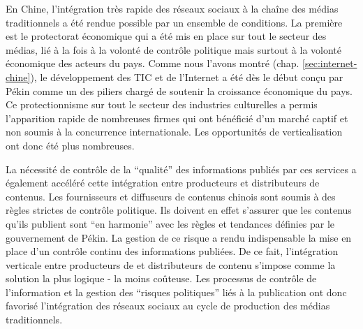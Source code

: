 En Chine, l'intégration très rapide des réseaux sociaux à la chaîne des médias traditionnels a été rendue possible par un ensemble de conditions. La première est le protectorat économique qui a été mis en place sur tout le secteur des médias, lié à la fois à la volonté de contrôle politique mais surtout à la volonté économique des acteurs du pays. Comme nous l'avons montré (chap. \ref{sec:internet-chine}), le développement des TIC et de l'Internet a été dès le début conçu par Pékin comme un des piliers chargé de soutenir la croissance économique du pays. Ce protectionnisme sur tout le secteur des industries culturelles a permis l'apparition rapide de nombreuses firmes qui ont bénéficié d'un marché captif et non soumis à la concurrence internationale. Les opportunités de verticalisation ont donc été plus nombreuses. 

La nécessité de contrôle de la ``qualité'' des informations publiés par ces services a également accéléré cette intégration entre producteurs et distributeurs de contenus. Les fournisseurs et diffuseurs de contenus chinois sont soumis à des règles strictes de contrôle politique. Ils doivent en effet s'assurer que les contenus qu'ils publient sont ``en harmonie'' avec les règles et tendances définies par le gouvernement de Pékin. La gestion de ce risque a rendu indispensable la mise en place d'un contrôle continu des informations publiées. De ce fait, l'intégration verticale entre producteurs de et distributeurs de contenu s'impose comme la solution la plus logique - la moins coûteuse. Les processus de contrôle de l'information et la gestion des ``risques politiques'' liés à la publication ont donc favorisé l'intégration des réseaux sociaux au cycle de production des médias traditionnels.

